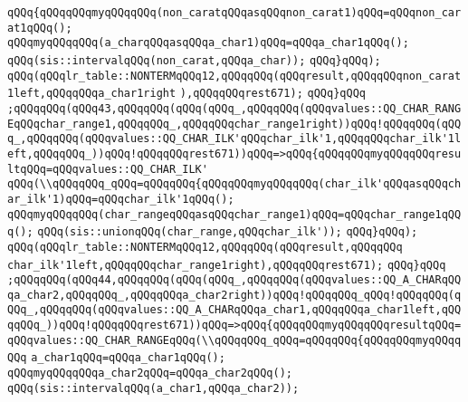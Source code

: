 \verb|qQQq{qQQqqQQqmyqQQqqQQq(non_caratqQQqasqQQqnon_carat1)qQQq=qQQqnon_carat1qQQq();|\newline
\verb|qQQqmyqQQqqQQq(a_charqQQqasqQQqa_char1)qQQq=qQQqa_char1qQQq();|\newline
\verb|qQQq(sis::intervalqQQq(non_carat,qQQqa_char));|\newline
\verb|qQQq}qQQq);|\newline
\verb|qQQq(qQQqlr_table::NONTERMqQQq12,qQQqqQQq(qQQqresult,qQQqqQQqnon_carat1left,qQQqqQQqa_char1right|\newline
\verb|),qQQqqQQqrest671);|\newline
\verb|qQQq}qQQq|\newline
\verb|;qQQqqQQq(qQQq43,qQQqqQQq(qQQq(qQQq_,qQQqqQQq(qQQqvalues::QQ_CHAR_RANGEqQQqchar_range1,qQQqqQQq_,qQQqqQQqchar_range1right))qQQq!qQQqqQQq(qQQq_,qQQqqQQq(qQQqvalues::QQ_CHAR_ILK'qQQqchar_ilk'1,qQQqqQQqchar_ilk'1left,qQQqqQQq_))qQQq!qQQqqQQqrest671))qQQq=>qQQq{qQQqqQQqmyqQQqqQQqresultqQQq=qQQqvalues::QQ_CHAR_ILK'|\newline
\verb|qQQq(\\qQQqqQQq_qQQq=qQQqqQQq{qQQqqQQqmyqQQqqQQq(char_ilk'qQQqasqQQqchar_ilk'1)qQQq=qQQqchar_ilk'1qQQq();|\newline
\verb|qQQqmyqQQqqQQq(char_rangeqQQqasqQQqchar_range1)qQQq=qQQqchar_range1qQQq();|\newline
\verb|qQQq(sis::unionqQQq(char_range,qQQqchar_ilk'));|\newline
\verb|qQQq}qQQq);|\newline
\verb|qQQq(qQQqlr_table::NONTERMqQQq12,qQQqqQQq(qQQqresult,qQQqqQQq|\newline
\verb|char_ilk'1left,qQQqqQQqchar_range1right),qQQqqQQqrest671);|\newline
\verb|qQQq}qQQq|\newline
\verb|;qQQqqQQq(qQQq44,qQQqqQQq(qQQq(qQQq_,qQQqqQQq(qQQqvalues::QQ_A_CHARqQQqa_char2,qQQqqQQq_,qQQqqQQqa_char2right))qQQq!qQQqqQQq_qQQq!qQQqqQQq(qQQq_,qQQqqQQq(qQQqvalues::QQ_A_CHARqQQqa_char1,qQQqqQQqa_char1left,qQQqqQQq_))qQQq!qQQqqQQqrest671))qQQq=>qQQq{qQQqqQQqmyqQQqqQQqresultqQQq=qQQqvalues::QQ_CHAR_RANGEqQQq(\\qQQqqQQq_qQQq=qQQqqQQq{qQQqqQQqmyqQQqqQQq|\newline
\verb|a_char1qQQq=qQQqa_char1qQQq();|\newline
\verb|qQQqmyqQQqqQQqa_char2qQQq=qQQqa_char2qQQq();|\newline
\verb|qQQq(sis::intervalqQQq(a_char1,qQQqa_char2));|\newline
